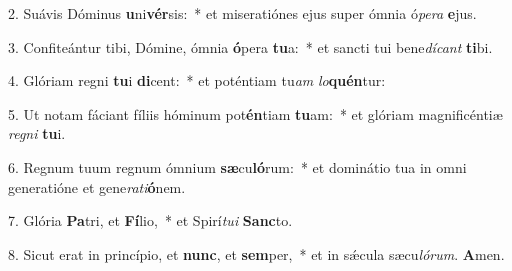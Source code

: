 2. Suávis Dóminus \textbf{u}ni\textbf{vér}sis:~*  et miseratiónes ejus super ómnia ó\textit{pe}\textit{ra} \textbf{e}jus.\

3. Confiteántur tibi, Dómine, ómnia \textbf{ó}pera \textbf{tu}a:~*  et sancti tui bene\textit{dí}\textit{cant} \textbf{ti}bi.\

4. Glóriam regni \textbf{tu}i \textbf{di}cent:~*  et poténtiam tu\textit{am} \textit{lo}\textbf{quén}tur:\

5. Ut notam fáciant fíliis hóminum pot\textbf{én}tiam \textbf{tu}am:~*  et glóriam magnificéntiæ \textit{re}\textit{gni} \textbf{tu}i.\

6. Regnum tuum regnum ómnium \textbf{sæ}cu\textbf{ló}rum:~*  et dominátio tua in omni generatióne et gene\textit{ra}\textit{ti}\textbf{ó}nem.\

7. Glória \textbf{Pa}tri, et \textbf{Fí}lio,~*  et Spirí\textit{tu}\textit{i} \textbf{Sanc}to.\

8. Sicut erat in princípio, et \textbf{nunc}, et \textbf{sem}per,~*  et in sǽcula sæcu\textit{ló}\textit{rum}. \textbf{A}men.\

